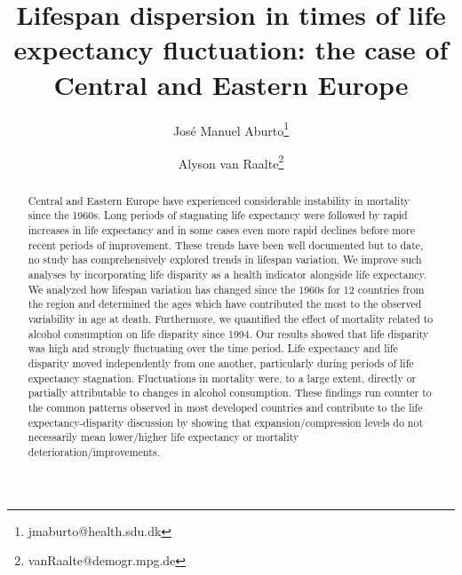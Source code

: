 \documentclass{article}
\title{Lifespan dispersion in times of life expectancy fluctuation: the case of Central and Eastern Europe}
\author[1]{Jos\'e Manuel Aburto\thanks{jmaburto@health.sdu.dk}}
\author[2]{Alyson van Raalte\thanks{vanRaalte@demogr.mpg.de}}
\affil[1]{Department of Public Health, MaxO, University of Southern Denmark}
\affil[2]{Max Planck Institute for Demographic Research}
\begin{document}
\maketitle

\begin{abstract}
Central and Eastern Europe have experienced considerable instability in mortality since the 1960s. Long periods of stagnating life expectancy were followed by rapid increases in life expectancy and in some cases even more rapid declines before more recent periods of improvement. These trends have been well documented but to date, no study has comprehensively explored trends in lifespan variation.  We improve such analyses by incorporating life disparity as a health indicator alongside life expectancy. We analyzed how lifespan variation has changed since the 1960s for 12 countries from the region and determined the ages which have contributed the most to the observed variability in age at death. Furthermore, we quantified the effect of mortality related to alcohol consumption on life disparity since 1994. Our results showed that life disparity was high and strongly fluctuating over the time period. Life expectancy and life disparity moved independently from one another, particularly during periods of life expectancy stagnation. Fluctuations in mortality were, to a large extent, directly or partially attributable to changes in alcohol consumption. These findings run counter to the common patterns observed in most developed countries and contribute to the life expectancy-disparity discussion by showing that expansion/compression levels do not necessarily mean lower/higher life expectancy or mortality deterioration/improvements. 
\end{abstract}


\newpage
\end{document}
